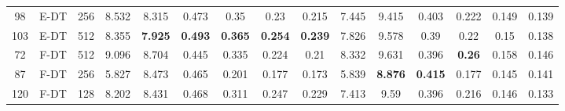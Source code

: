\begin{table}
\begin{tabular}{@{\hskip3pt}c@{\hskip3pt}c@{\hskip3pt}c@{\hskip3pt}c@{\hskip3pt}c@{\hskip3pt}c@{\hskip3pt}c@{\hskip3pt}c@{\hskip3pt}c@{\hskip3pt}c@{\hskip3pt}c@{\hskip3pt}c@{\hskip3pt}c@{\hskip3pt}c@{\hskip3pt}c}
         98 &           E-DT &              256 &             8.532 &           8.315 &           0.473 &            0.35 &            0.23 &           0.215 &               7.445 &           9.415 &           0.403 &          0.222 &          0.149 &           0.139 \\
        103 &           E-DT &              512 &             8.355 &  \textbf{7.925} &  \textbf{0.493} &  \textbf{0.365} &  \textbf{0.254} &  \textbf{0.239} &               7.826 &           9.578 &            0.39 &           0.22 &           0.15 &           0.138 \\
         72 &           F-DT &              512 &             9.096 &           8.704 &           0.445 &           0.335 &           0.224 &            0.21 &               8.332 &           9.631 &           0.396 &  \textbf{0.26} &          0.158 &           0.146 \\
         87 &           F-DT &              256 &             5.827 &           8.473 &           0.465 &           0.201 &           0.177 &           0.173 &               5.839 &  \textbf{8.876} &  \textbf{0.415} &          0.177 &          0.145 &           0.141 \\
        120 &           F-DT &              128 &             8.202 &           8.431 &           0.468 &           0.311 &           0.247 &           0.229 &               7.413 &            9.59 &           0.396 &          0.216 &          0.146 &           0.133 \\
\bottomrule
\end{tabular}
\end{table}
